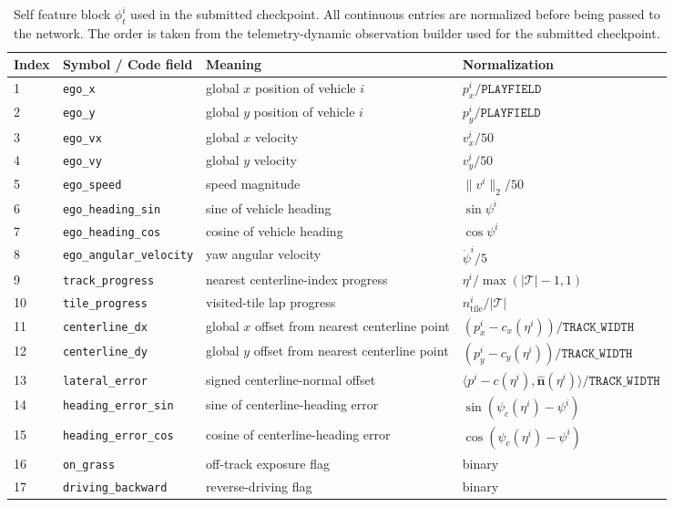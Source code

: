\documentclass[journal]{IEEEtran}
\begin{document}
\begin{table}[t]
\centering
\caption{Self feature block $\phi_t^i$ used in the submitted checkpoint.
All continuous entries are normalized before being passed to the
network. The order is taken from the telemetry-dynamic observation
builder used for the submitted checkpoint.}
\label{tab:self_feature_block}
\begin{tabular}{llll}
\hline
Index & Symbol / Code field & Meaning & Normalization \\
\hline
1  & \texttt{ego\_x} & global $x$ position of vehicle $i$ & $p_x^i/\texttt{PLAYFIELD}$ \\
2  & \texttt{ego\_y} & global $y$ position of vehicle $i$ & $p_y^i/\texttt{PLAYFIELD}$ \\
3  & \texttt{ego\_vx} & global $x$ velocity & $v_x^i/50$ \\
4  & \texttt{ego\_vy} & global $y$ velocity & $v_y^i/50$ \\
5  & \texttt{ego\_speed} & speed magnitude & $\|v^i\|_2/50$ \\
6  & \texttt{ego\_heading\_sin} & sine of vehicle heading & $\sin\psi^i$ \\
7  & \texttt{ego\_heading\_cos} & cosine of vehicle heading & $\cos\psi^i$ \\
8  & \texttt{ego\_angular\_velocity} & yaw angular velocity & $\dot{\psi}^i/5$ \\
9  & \texttt{track\_progress} & nearest centerline-index progress & $\eta^i/\max(|\mathcal{T}|-1,1)$ \\
10 & \texttt{tile\_progress} & visited-tile lap progress & $n_{\mathrm{tile}}^i/|\mathcal{T}|$ \\
11 & \texttt{centerline\_dx} & global $x$ offset from nearest centerline point & $(p_x^i-c_x(\eta^i))/\texttt{TRACK\_WIDTH}$ \\
12 & \texttt{centerline\_dy} & global $y$ offset from nearest centerline point & $(p_y^i-c_y(\eta^i))/\texttt{TRACK\_WIDTH}$ \\
13 & \texttt{lateral\_error} & signed centerline-normal offset & $\langle p^i-c(\eta^i),\hat{\mathbf n}(\eta^i)\rangle/\texttt{TRACK\_WIDTH}$ \\
14 & \texttt{heading\_error\_sin} & sine of centerline-heading error & $\sin(\psi_c(\eta^i)-\psi^i)$ \\
15 & \texttt{heading\_error\_cos} & cosine of centerline-heading error & $\cos(\psi_c(\eta^i)-\psi^i)$ \\
16 & \texttt{on\_grass} & off-track exposure flag & binary \\
17 & \texttt{driving\_backward} & reverse-driving flag & binary \\
\hline
\end{tabular}
\end{table}
\end{document}

